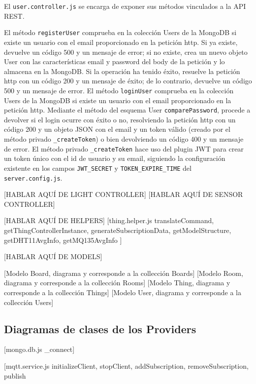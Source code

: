 \vspace{1cm}

El \verb|user.controller.js| se encarga de exponer sus métodos vinculados a la API REST.

\vspace{0.5cm}

El método \verb|registerUser| comprueba en la colección Users de la MongoDB si existe un usuario con el email proporcionado en la petición http. Si ya existe, devuelve un código 500 y un mensaje de error; si no existe, crea un nuevo objeto User con las características email y password del body de la petición y lo almacena en la MongoDB. Si la operación ha tenido éxito, resuelve la petición http con un código 200 y un mensaje de éxito; de lo contrario, devuelve un código 500 y un mensaje de error.
El método \verb|loginUser| comprueba en la colección Users de la MongoDB si existe un usuario con el email proporcionado en la petición http. Mediante el método del esquema User \verb|comparePassword|, procede a devolver si el login ocurre con éxito o no, resolviendo la petición http con un código 200 y un objeto JSON con el email y un token válido (creado por el método privado \verb|_createToken|) o bien devolviendo un código 400 y un mensaje de error.
El método privado \verb|_createToken| hace uso del plugin JWT para crear un token único con el id de usuario y su email, siguiendo la configuración existente en los campos \verb|JWT_SECRET| y \verb|TOKEN_EXPIRE_TIME| del \verb|server.config.js|.

[HABLAR AQUÍ DE LIGHT CONTROLLER]
[HABLAR AQUÍ DE SENSOR CONTROLLER]

[HABLAR AQUÍ DE HELPERS]
[thing.helper.js
  translateCommand,
  getThingControllerInstance,
  generateSubscriptionData,
  getModelStructure,
  getDHT11AvgInfo,
  getMQ135AvgInfo
]

[HABLAR AQUÍ DE MODELS]

[Modelo Board, diagrama y corresponde a la collección Boards]
[Modelo Room, diagrama y corresponde a la collección Rooms]
[Modelo Thing, diagrama y corresponde a la collección Things]
[Modelo User, diagrama y corresponde a la collección Users]

\subsection{Diagramas de clases de los Providers}
\label{makereference4.6.5}

[mongo.db.js _connect]

[mqtt.service.js
  initializeClient,
  stopClient,
  addSubscription,
  removeSubscription,
  publish
  

